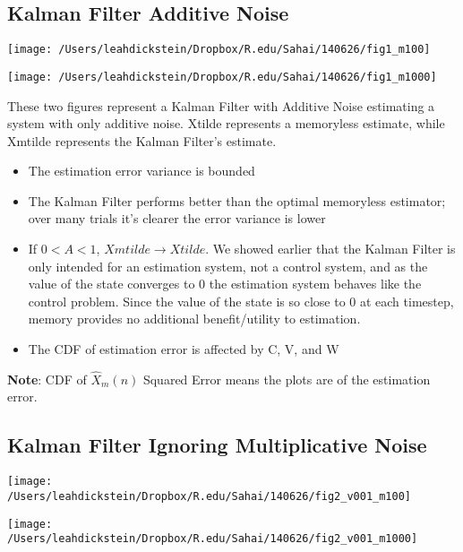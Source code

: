 \documentclass[leqno,twocolumn]{article}
\begin{document}
\subsection{Kalman Filter Additive Noise}
\begin{minipage}[c]{0.5\textwidth}
\texttt{[image: /Users/leahdickstein/Dropbox/R.edu/Sahai/140626/fig1\_m100]}
\end{minipage}
\begin{minipage}[c]{0.5\textwidth}
\texttt{[image: /Users/leahdickstein/Dropbox/R.edu/Sahai/140626/fig1\_m1000]}
\end{minipage}
These two figures represent a Kalman Filter with Additive Noise estimating a system with only additive noise. Xtilde represents a memoryless estimate, while Xmtilde represents the Kalman Filter's estimate.
\begin{itemize}
\item The estimation error variance is bounded
\item The Kalman Filter performs better than the optimal memoryless estimator; over many trials it's clearer the error variance is lower
\item If $0 < A < 1$, $Xmtilde \rightarrow Xtilde$. We showed earlier that the Kalman Filter is only intended for an estimation system, not a control system, and as the value of the state converges to 0 the estimation system behaves like the control problem. Since the value of the state is so close to 0 at each timestep, memory provides no additional benefit/utility to estimation.
\item The CDF of estimation error is affected by C, V, and W
\end{itemize}
\textbf{Note}: CDF of $\hat{X}_m(n)$ Squared Error means the plots are of the estimation error.

\subsection{Kalman Filter Ignoring Multiplicative Noise}
\begin{minipage}[c]{0.5\textwidth}
\texttt{[image: /Users/leahdickstein/Dropbox/R.edu/Sahai/140626/fig2\_v001\_m100]}
\end{minipage}
\begin{minipage}[c]{0.5\textwidth}
\texttt{[image: /Users/leahdickstein/Dropbox/R.edu/Sahai/140626/fig2\_v001\_m1000]}
\end{minipage}
\end{document}
